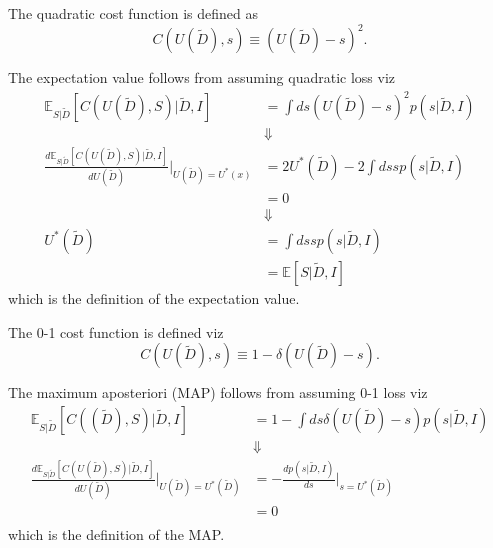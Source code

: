 \begin{definition}
	\label{def:quadratic_cost}
	The quadratic cost function is defined as
	\begin{equation}
		C(U(\tilde{D}),s) \equiv (U(\tilde{D})-s)^2.
	\end{equation}
\end{definition}

\begin{theorem}
	\label{theorem:expectation_cost}
	The expectation value follows from assuming quadratic loss viz
	\begin{equation}
		\begin{split}
			\mathbb{E}_{S|\tilde{D}}[C(U(\tilde{D}), S)|\tilde{D},I] &= \int ds (U(\tilde{D})-s)^2 p(s|\tilde{D},I)\\
			&\Downarrow\\
			\frac{d \mathbb{E}_{S|\tilde{D}}[C(U(\tilde{D}), S)|\tilde{D},I]}{dU(\tilde{D})}\bigg|_{U(\tilde{D})=U^*(x)} &= 2U^*(\tilde{D})-2\int ds sp(s|\tilde{D},I)\\
			&=0\\
			&\Downarrow\\
			U^*(\tilde{D})& = \int ds sp(s|\tilde{D},I)\\
			&= \mathbb{E}[S|\tilde{D},I]
		\end{split}
	\end{equation}
	which is the definition of the expectation value.
\end{theorem}

\begin{definition}
	\label{def:0_1_cost_function}
	The 0-1 cost function is defined viz
	\begin{equation}
		C(U(\tilde{D}),s) \equiv 1-\delta(U(\tilde{D})-s).
	\end{equation}
\end{definition}

\begin{theorem}[MAP]
	\label{theorem:MAP}
	The maximum aposteriori (MAP) follows from assuming 0-1 loss viz
	\begin{equation}
		\begin{split}
			\mathbb{E}_{S|\tilde{D}}[C((\tilde{D}), S)|\tilde{D},I] &= 1-\int ds \delta(U(\tilde{D})-s) p(s|\tilde{D},I)\\
			&\Downarrow\\
			\frac{d \mathbb{E}_{S|\tilde{D}}[C(U(\tilde{D}), S)|\tilde{D},I]}{dU(\tilde{D})}\bigg|_{U(\tilde{D})=U^*(\tilde{D})} &= -\frac{dp(s|\tilde{D},I)}{ds}\bigg|_{s=U^*(\tilde{D})}\\
			&=0\\
		\end{split}
	\end{equation}
	which is the definition of the MAP.
\end{theorem}



